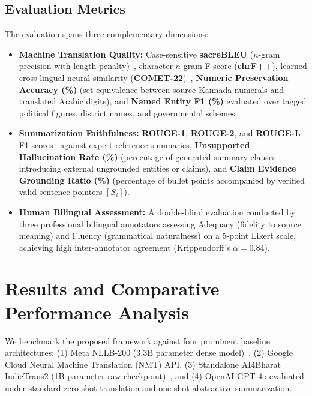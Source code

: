 \documentclass[conference]{IEEEtran}
\begin{document}
\subsection{Evaluation Metrics}
The evaluation spans three complementary dimensions:
\begin{itemize}
    \item \textbf{Machine Translation Quality:} Case-sensitive \textbf{sacreBLEU} ($n$-gram precision with length penalty)~\cite{vaswani2017attention}, character $n$-gram F-score (\textbf{chrF++}), learned cross-lingual neural similarity (\textbf{COMET-22})~\cite{rei2020comet}, \textbf{Numeric Preservation Accuracy (\%)} (set-equivalence between source Kannada numerals and translated Arabic digits), and \textbf{Named Entity F1 (\%)} evaluated over tagged political figures, district names, and governmental schemes.
    \item \textbf{Summarization Faithfulness:} \textbf{ROUGE-1}, \textbf{ROUGE-2}, and \textbf{ROUGE-L} F1 scores~\cite{lin2004rouge} against expert reference summaries, \textbf{Unsupported Hallucination Rate (\%)} (percentage of generated summary clauses introducing external ungrounded entities or claims), and \textbf{Claim Evidence Grounding Ratio (\%)} (percentage of bullet points accompanied by verified valid sentence pointers $[S_i]$).
    \item \textbf{Human Bilingual Assessment:} A double-blind evaluation conducted by three professional bilingual annotators assessing Adequacy (fidelity to source meaning) and Fluency (grammatical naturalness) on a 5-point Likert scale, achieving high inter-annotator agreement (Krippendorff's $\alpha = 0.84$).
\end{itemize}

\section{Results and Comparative Performance Analysis}
\label{sec:results}

We benchmark the proposed framework against four prominent baseline architectures: (1) Meta NLLB-200 (3.3B parameter dense model)~\cite{nllb2024scaling}, (2) Google Cloud Neural Machine Translation (NMT) API, (3) Standalone AI4Bharat IndicTrans2 (1B parameter raw checkpoint)~\cite{gala2023indictrans2}, and (4) OpenAI GPT-4o evaluated under standard zero-shot translation and one-shot abstractive summarization.
\end{document}
